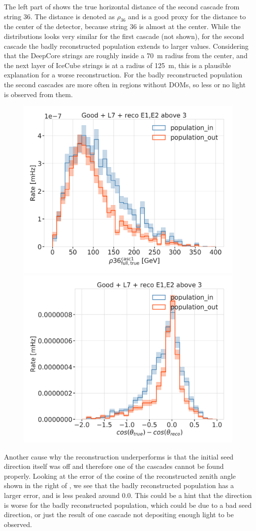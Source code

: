 The left part of  shows the true horizontal distance of the second cascade from string 36. The distance is denoted as $\rho_{36}$ and is a good proxy for the distance to the center of the detector, because string 36 is almost at the center. While the distributions looks very similar for the first cascade (not shown), for the second cascade the badly reconstructed population extends to larger values. Considering that the DeepCore strings are roughly inside a \SI{70}{\meter} radius from the center, and the next layer of IceCube strings is at a radius of \SI{125}{\meter}, this is a plausible explanation for a worse reconstruction. For the badly reconstructed population the second cascades are more often in regions without DOMs, so less or no light is observed from them.

\begin{figure}[h]
    \centering
    \includegraphics[width=0.49\linewidth]{figures/results/190607/second_population/casc1_rho36.png}
    \includegraphics[width=0.49\linewidth]{figures/results/190607/second_population/reco_true_cos_zenith_error_populations.png}
    \caption[]{}
\end{figure}

Another cause why the reconstruction underperforms is that the initial seed direction itself was off and therefore one of the cascades cannot be found properly. Looking at the error of the cosine of the reconstructed zenith angle shown in the right of , we see that the badly reconstructed population has a larger error, and is less peaked around 0.0. This could be a hint that the direction is worse for the badly reconstructed population, which could be due to a bad seed direction, or just the result of one cascade not depositing enough light to be observed.

